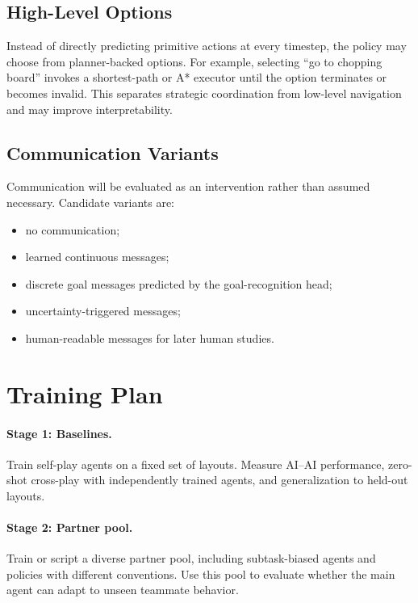 \documentclass[letterpaper]{article} %
\begin{document}
\subsection{High-Level Options}

Instead of directly predicting primitive actions at every timestep, the policy may choose from planner-backed options. For example, selecting ``go to chopping board'' invokes a shortest-path or A* executor until the option terminates or becomes invalid. This separates strategic coordination from low-level navigation and may improve interpretability.

\subsection{Communication Variants}

Communication will be evaluated as an intervention rather than assumed necessary. Candidate variants are:
\begin{itemize}
    \item no communication;
    \item learned continuous messages;
    \item discrete goal messages predicted by the goal-recognition head;
    \item uncertainty-triggered messages;
    \item human-readable messages for later human studies.
\end{itemize}

\section{Training Plan}

\paragraph{Stage 1: Baselines.}
Train self-play agents on a fixed set of layouts. Measure AI--AI performance, zero-shot cross-play with independently trained agents, and generalization to held-out layouts.

\paragraph{Stage 2: Partner pool.}
Train or script a diverse partner pool, including subtask-biased agents and policies with different conventions. Use this pool to evaluate whether the main agent can adapt to unseen teammate behavior.
\end{document}
